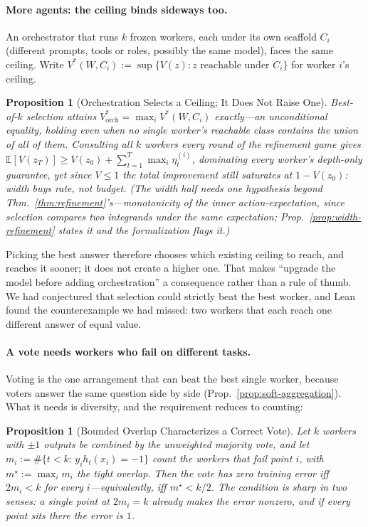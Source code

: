 \documentclass{article}
\newtheorem{proposition}[theorem]{Proposition}
\theoremstyle{remark}
\theoremstyle{plain}
\begin{document}
\paragraph{More agents: the ceiling binds sideways too.} An orchestrator that runs $k$ frozen workers, each under its own scaffold $C_i$ (different prompts, tools or roles, possibly the same model), faces the same ceiling. Write $V^*(W,C_i):=\sup\{V(z):z\text{ reachable under }C_i\}$ for worker $i$'s ceiling.

\begin{proposition}[Orchestration Selects a Ceiling; It Does Not Raise One]
\label{prop:orchestration}
Best-of-$k$ selection attains $V^*_{\mathrm{orch}}=\max_i V^*(W,C_i)$ \emph{exactly}---an unconditional equality, holding even when no single worker's reachable class contains the union of all of them. Consulting all $k$ workers every round of the refinement game gives $\mathbb{E}[V(z_T)]\ge V(z_0)+\sum_{t=1}^T\max_i\eta_t^{(i)}$, dominating every worker's depth-only guarantee, yet since $V\le1$ the total improvement still saturates at $1-V(z_0)$: width buys rate, not budget. (The width half needs one hypothesis beyond Thm.~\ref{thm:refinement}'s---monotonicity of the inner action-expectation, since selection compares two integrands under the same expectation; Prop.~\ref{prop:width-refinement} states it and the formalization flags it.)
\end{proposition}

Picking the best answer therefore chooses which existing ceiling to reach, and reaches it sooner; it does not create a higher one. That makes ``upgrade the model before adding orchestration'' a consequence rather than a rule of thumb. We had conjectured that selection could strictly beat the best worker, and Lean found the counterexample we had missed: two workers that each reach one different answer of equal value.

\paragraph{A vote needs workers who fail on different tasks.} Voting is the one arrangement that can beat the best single worker, because voters answer the same question side by side (Prop.~\ref{prop:soft-aggregation}). What it needs is diversity, and the requirement reduces to counting:

\begin{proposition}[Bounded Overlap Characterizes a Correct Vote]
\label{prop:diversity}
Let $k$ workers with $\pm1$ outputs be combined by the \emph{unweighted} majority vote, and let $m_i:=\#\{t<k:\,y_ih_t(x_i)={-}1\}$ count the workers that fail point $i$, with $m^\star:=\max_i m_i$ the \emph{tight overlap}. Then the vote has zero training error \emph{iff} $2m_i<k$ for every $i$---equivalently, iff $m^\star{<}k/2$. The condition is sharp in two senses: a single point at $2m_i{=}k$ already makes the error nonzero, and if \emph{every} point sits there the error is $1$.
\end{proposition}
\end{document}
